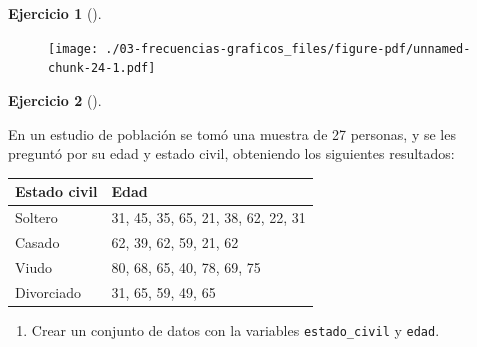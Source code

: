 \documentclass[
  a4paper,
]{scrreport}
\providecommand{\tightlist}{%
  \setlength{\itemsep}{0pt}\setlength{\parskip}{0pt}}\usepackage{longtable,booktabs,array}
\theoremstyle{definition}
\newtheorem{exercise}{Ejercicio}[chapter]
\theoremstyle{remark}
\begin{document}
\begin{exercise}[]
\begin{tcolorbox}
\begin{figure}[H]

{\centering \texttt{[image: ./03-frecuencias-graficos\_files/figure-pdf/unnamed-chunk-24-1.pdf]}

}

\end{figure}

\end{tcolorbox}

\end{exercise}

\leavevmode{}%
\begin{exercise}[]\label{exr-4}

En un estudio de población se tomó una muestra de 27 personas, y se les
preguntó por su edad y estado civil, obteniendo los siguientes
resultados:

\begin{longtable}[]{@{}ll@{}}
\toprule()
Estado civil & Edad \\
\midrule()
\endhead
Soltero & 31, 45, 35, 65, 21, 38, 62, 22, 31 \\
Casado & 62, 39, 62, 59, 21, 62 \\
Viudo & 80, 68, 65, 40, 78, 69, 75 \\
Divorciado & 31, 65, 59, 49, 65 \\
\bottomrule()
\end{longtable}

\begin{enumerate}
\def\labelenumi{\alph{enumi}.}
\tightlist
\item
  Crear un conjunto de datos con la variables \texttt{estado\_civil} y
  \texttt{edad}.
\end{enumerate}

\begin{tcolorbox}[enhanced jigsaw, rightrule=.15mm, toptitle=1mm, colbacktitle=quarto-callout-tip-color!10!white, titlerule=0mm, colback=white, leftrule=.75mm, bottomtitle=1mm, colframe=quarto-callout-tip-color-frame, breakable, title=\textcolor{quarto-callout-tip-color}{\faLightbulb}\hspace{0.5em}{Solución}, arc=.35mm, coltitle=black, opacityback=0, bottomrule=.15mm, opacitybacktitle=0.6, left=2mm, toprule=.15mm]


\end{tcolorbox}
\end{exercise}
\end{document}
